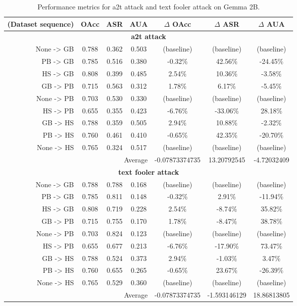 \documentclass{article}
\begin{document}
\begin{table}[ht]
\centering
\caption{Performance metrics for a2t attack and text fooler attack on Gemma 2B.}
\small
\begin{tabular}{r|ccc|ccc}
\hline
\textbf{(Dataset sequence)} & \textbf{OAcc} & \textbf{ASR} & \textbf{AUA} & \textbf{$\Delta$ OAcc} & \textbf{$\Delta$ ASR} & \textbf{$\Delta$ AUA} \\ \hline
\multicolumn{7}{c}{\textbf{a2t attack}} \\ \hline
None -> GB & 0.788 & 0.362 & 0.503 & (baseline) & (baseline) & (baseline) \\
PB -> GB & 0.785 & 0.516 & 0.380 & -0.32\% & 42.56\% & -24.45\% \\
HS -> GB & 0.808 & 0.399 & 0.485 & 2.54\% & 10.36\% & -3.58\% \\
GB -> PB & 0.715 & 0.563 & 0.312 & 1.78\% & 6.17\% & -5.45\% \\
None -> PB & 0.703 & 0.530 & 0.330 & (baseline) & (baseline) & (baseline) \\
HS -> PB & 0.655 & 0.355 & 0.423 & -6.76\% & -33.06\% & 28.18\% \\
GB -> HS & 0.788 & 0.359 & 0.505 & 2.94\% & 10.88\% & -2.32\% \\
PB -> HS & 0.760 & 0.461 & 0.410 & -0.65\% & 42.35\% & -20.70\% \\
None -> HS & 0.765 & 0.324 & 0.517 & (baseline) & (baseline) & (baseline) \\ \hline
\multicolumn{4}{r|}{Average} & -0.07873374735 & 13.20792545 & -4.72032409 \\ \hline
\multicolumn{7}{c}{\textbf{text fooler attack}} \\ \hline
None -> GB & 0.788 & 0.788 & 0.168 & (baseline) & (baseline) & (baseline) \\
PB -> GB & 0.785 & 0.811 & 0.148 & -0.32\% & 2.91\% & -11.94\% \\
HS -> GB & 0.808 & 0.719 & 0.228 & 2.54\% & -8.74\% & 35.82\% \\
GB -> PB & 0.715 & 0.755 & 0.170 & 1.78\% & -8.47\% & 38.78\% \\
None -> PB & 0.703 & 0.824 & 0.123 & (baseline) & (baseline) & (baseline) \\
HS -> PB & 0.655 & 0.677 & 0.213 & -6.76\% & -17.90\% & 73.47\% \\
GB -> HS & 0.788 & 0.524 & 0.373 & 2.94\% & -1.03\% & 3.47\% \\
PB -> HS & 0.760 & 0.655 & 0.265 & -0.65\% & 23.67\% & -26.39\% \\
None -> HS & 0.765 & 0.529 & 0.360 & (baseline) & (baseline) & (baseline) \\ \hline
\multicolumn{4}{r|}{Average} & -0.07873374735 & -1.593146129 & 18.86813805 \\ \hline
\end{tabular}
\label{table:gemma_2b_attack_comparison}
\end{table}
\end{document}
